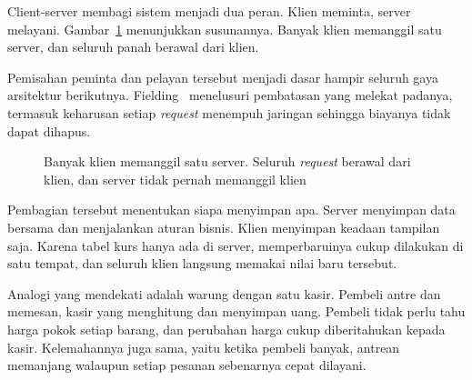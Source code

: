 Client-server membagi sistem menjadi dua peran. Klien meminta, server melayani.
Gambar~\ref{fig:client-server} menunjukkan susunannya. Banyak klien memanggil
satu server, dan seluruh panah berawal dari klien.

Pemisahan peminta dan pelayan tersebut menjadi dasar hampir seluruh gaya
arsitektur berikutnya. Fielding~\cite{fielding2000architectural} menelusuri
pembatasan yang melekat padanya, termasuk keharusan setiap \textit{request} menempuh
jaringan sehingga biayanya tidak dapat dihapus.

\begin{figure}[htbp]
  \centering
  \caption{Banyak klien memanggil satu server. Seluruh \textit{request} berawal dari
    klien, dan server tidak pernah memanggil klien}
  \label{fig:client-server}
\end{figure}

Pembagian tersebut menentukan siapa menyimpan apa. Server menyimpan data
bersama dan menjalankan aturan bisnis. Klien menyimpan keadaan tampilan saja.
Karena tabel kurs hanya ada di server, memperbaruinya cukup dilakukan di satu
tempat, dan seluruh klien langsung memakai nilai baru tersebut.

Analogi yang mendekati adalah warung dengan satu kasir. Pembeli antre dan
memesan, kasir yang menghitung dan menyimpan uang. Pembeli tidak perlu tahu
harga pokok setiap barang, dan perubahan harga cukup diberitahukan kepada kasir.
Kelemahannya juga sama, yaitu ketika pembeli banyak, antrean memanjang walaupun
setiap pesanan sebenarnya cepat dilayani.


